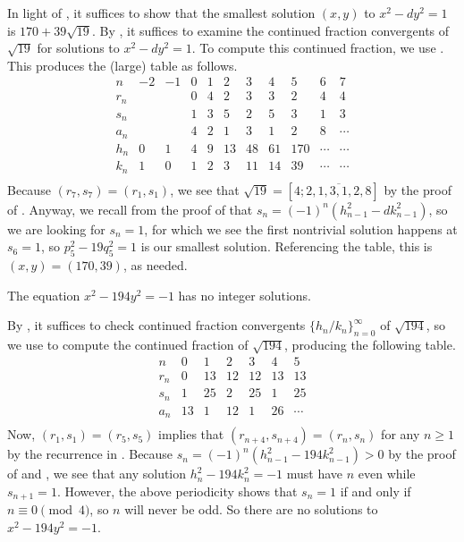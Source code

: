 \documentclass[../notes.tex]{subfiles}
\begin{document}
\begin{solution}
	In light of , it suffices to show that the smallest solution $(x,y)$ to $x^2-dy^2=1$ is $170+39\sqrt{19}$. By , it suffices to examine the continued fraction convergents of $\sqrt{19}$ for solutions to $x^2-dy^2=1$. To compute this continued fraction, we use . This produces the (large) table as follows.
	\[\begin{array}{c|cc|cccccccc}
		  n & -2 & -1 &  0 &  1 &  2 &  3 &  4 &  5 &  6 &  7 \\\hline
		r_n &    &    &  0 &  4 &  2 &  3 &  3 &  2 &  4 &  4 \\
		s_n &    &    &  1 &  3 &  5 &  2 &  5 &  3 &  1 &  3 \\
		a_n &    &    &  4 &  2 &  1 &  3 &  1 &  2 &  8 & \cdots \\\hline
		h_n & 0  & 1  & 4 & 9 & 13& 48& 61&170 & \cdots & \cdots \\
		k_n & 1  & 0  & 1 & 2 & 3 & 11& 14& 39 & \cdots & \cdots \\
	\end{array}\]
	Because $(r_7,s_7)=(r_1,s_1)$, we see that $\sqrt{19}=[4;\overline{2,1,3,1,2,8}]$ by the proof of . Anyway, we recall from the proof of  that $s_n=(-1)^n\left(h_{n-1}^2-dk_{n-1}^2\right)$, so we are looking for $s_n=1$, for which we see the first nontrivial solution happens at $s_6=1$, so $p_5^2-19q_5^2=1$ is our smallest solution. Referencing the table, this is $(x,y)=(170,39)$, as needed.
\end{solution}
\begin{example}
	The equation $x^2-194y^2=-1$ has no integer solutions.
\end{example}
\begin{solution}
	By , it suffices to check continued fraction convergents $\{h_n/k_n\}_{n=0}^\infty$ of $\sqrt{194}$, so we use  to compute the continued fraction of $\sqrt{194}$, producing the following table.
	\[\begin{array}{c|cccccccccc}
		  n &  0 &  1 &  2 &  3 &  4 &  5 \\\hline
		r_n &  0 & 13 & 12 & 12 & 13 & 13 \\
		s_n &  1 & 25 &  2 & 25 &  1 & 25 \\
		a_n & 13 &  1 & 12 &  1 & 26 & \cdots \\
	\end{array}\]
	Now, $(r_1,s_1)=(r_5,s_5)$ implies that $(r_{n+4},s_{n+4})=(r_n,s_n)$ for any $n\ge1$ by the recurrence in . Because $s_n=(-1)^n\left(h_{n-1}^2-194k_{n-1}^2\right)>0$ by the proof of  and , we see that any solution $h_n^2-194k_n^2=-1$ must have $n$ even while $s_{n+1}=1$. However, the above periodicity shows that $s_n=1$ if and only if $n\equiv0\pmod4$, so $n$ will never be odd. So there are no solutions to $x^2-194y^2=-1$.
\end{solution}
\end{document}

